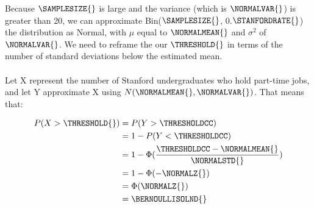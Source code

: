 Because $\SAMPLESIZE{}$ is large and the variance (which is $\NORMALVAR{}$) is greater than 20, we can approximate Bin($\SAMPLESIZE{}$, 0.$\STANFORDRATE{}$) the distribution as Normal, with $\mu$ equal to $\NORMALMEAN{}$ and $\sigma^{2}$ of $\NORMALVAR{}$.  We need to reframe the our $\THRESHOLD{}$ in terms of the number of standard deviations below the estimated mean. \\
\\
Let X represent the number of Stanford undergraduates who hold part-time jobs, and let Y approximate X using $N(\NORMALMEAN{},\NORMALVAR{})$.  That means that:

\begin{equation*}
\begin{split}
P(X > \THRESHOLD{}) &= P(Y > \THRESHOLDCC) \\
                    &= 1 - P(Y < \THRESHOLDCC) \\
                    &= 1 - \Phi(\frac{\THRESHOLDCC - \NORMALMEAN{}}{\NORMALSTD{}}) \\
                    &= 1 - \Phi(-\NORMALZ{}) \\
                    &= \Phi(\NORMALZ{}) \\
                    &= \BERNOULLISOLND{}
\end{split}
\end{equation*}

    